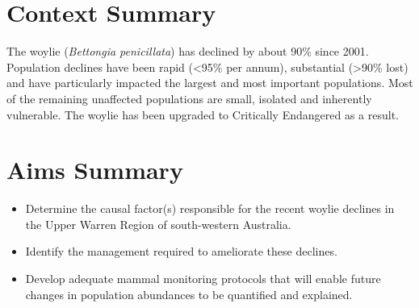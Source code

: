 \documentclass[version=last, paper=a4, DIV=18, usenames, dvipsnames]{scrartcl}
\begin{document}
%

%




\section*{Context Summary}
The woylie (\emph{Bettongia penicillata}) has declined by about 90\%
since 2001. Population declines have been rapid (\textless{}95\% per
annum), substantial (\textgreater{}90\% lost) and have particularly
impacted the largest and most important populations. Most of the
remaining unaffected populations are small, isolated and inherently
vulnerable. The woylie has been upgraded to Critically Endangered as a
result.



\section*{Aims Summary}
\begin{itemize}
\itemsep1pt\parskip0pt
\item
  Determine the causal factor(s) responsible for the recent woylie
  declines in the Upper Warren Region of south-western Australia.
\item
  Identify the management required to ameliorate these declines.
\item
  Develop adequate mammal monitoring protocols that will enable future
  changes in population abundances to be quantified and explained.
\end{itemize}
\end{document}
